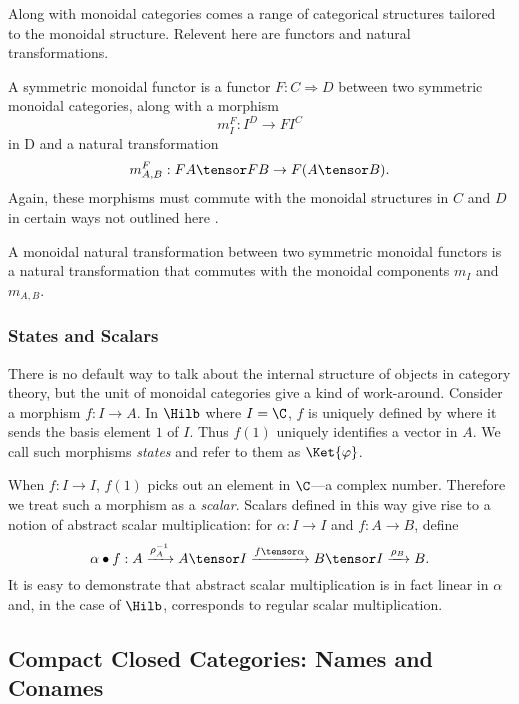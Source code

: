 Along with monoidal categories comes a range of categorical structures tailored
to the monoidal structure. Relevent here are functors and natural transformations.

\begin{definition}
A symmetric monoidal functor is a functor $F : C \Rightarrow D$ between two symmetric
monoidal categories, along with a morphism
\[ m_I^F : I^D \rightarrow F I^C \]
in D and a natural transformation
\[ m_{A,B}^F : F A \tensor F B \rightarrow F(A \tensor B). \]
Again, these morphisms must commute with the monoidal structures in $C$ and $D$
in certain ways not outlined here \citep{bierman1995categorical}.

A monoidal natural transformation between two symmetric monoidal functors
is a natural transformation that commutes with the monoidal components $m_I$ and $m_{A,B}$.
\end{definition}

\subsubsection*{States and Scalars}
There is no default way to talk about the internal structure of objects in category theory,
but the unit of monoidal categories give a kind of work-around. Consider a morphism 
$f : I \rightarrow A$. In $\Hilb$ where $I=\C$, $f$ is uniquely defined by where it sends
the basis element $1$ of $I$. Thus $f(1)$ uniquely identifies a vector in $A$. We call such morphisms
\emph{states} and refer to them as $\Ket{\varphi}$.\footnotemark


When $f : I \rightarrow I$, $f(1)$ picks out an element in $\C$---a complex number.
Therefore we treat such a morphism as a \emph{scalar}.
Scalars defined in this way give rise to a notion of abstract scalar multiplication: for 
$\alpha : I \rightarrow I$ and $f : A \rightarrow B$, define
\[ \alpha \bullet f : A \xrightarrow{\rho_A^{-1}} A \tensor I
    \xrightarrow{f \tensor \alpha} B \tensor I
    \xrightarrow{\rho_B} B.
\]
It is easy to demonstrate that abstract scalar multiplication is in fact linear in $\alpha$
and, in the case of $\Hilb$, corresponds to regular scalar multiplication.


\subsection{Compact Closed Categories: Names and Conames}

